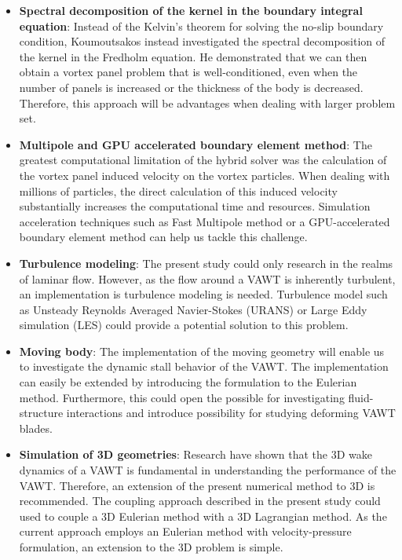 \begin{itemize}
\item \textbf{Spectral decomposition of the kernel in the boundary integral equation}: Instead of the Kelvin's theorem for solving the no-slip boundary condition, Koumoutsakos \cite{Koumoutsakos1993a} instead investigated the spectral decomposition of the kernel in the Fredholm equation. He demonstrated that we can then obtain a vortex panel problem that is well-conditioned, even when the number of panels is increased or the thickness of the body is decreased. Therefore, this approach will be advantages when dealing with larger problem set.

\item \textbf{Multipole and GPU accelerated boundary element method}: The greatest computational limitation of the hybrid solver was the calculation of the vortex panel induced velocity on the vortex particles. When dealing with millions of particles, the direct calculation of this induced velocity substantially increases the computational time and resources. Simulation acceleration techniques such as Fast Multipole method or a GPU-accelerated boundary element method can help us tackle this challenge.

\item \textbf{Turbulence modeling}: The present study could only research in the realms of laminar flow. However, as the flow around a VAWT is inherently turbulent, an implementation is turbulence modeling is needed. Turbulence model such as Unsteady Reynolds Averaged Navier-Stokes (URANS) or Large Eddy simulation (LES) could provide a potential solution to this problem.

\item \textbf{Moving body}: The implementation of the moving geometry will enable us to investigate the dynamic stall behavior of the VAWT. The implementation can easily be extended by introducing the  formulation to the Eulerian method. Furthermore, this could open the possible for investigating fluid-structure interactions and introduce possibility for studying deforming VAWT blades.

\item \textbf{Simulation of 3D geometries}: Research have shown that the 3D wake dynamics of a VAWT is fundamental in understanding the performance of the VAWT. Therefore, an extension of the present numerical method to 3D is recommended. The coupling approach described in the present study could used to couple a 3D Eulerian method with a 3D Lagrangian method. As the current approach employs an Eulerian method with velocity-pressure formulation, an extension to the 3D problem is simple.


\end{itemize}

